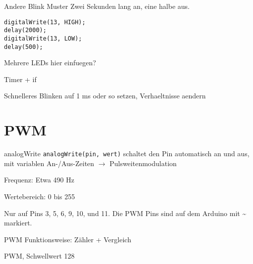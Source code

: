 \documentclass[bigger]{beamer}
\begin{document}
\begin{frame}[fragile,label=sec-1-4]{Andere Blink Muster}
 Zwei Sekunden lang an, eine halbe aus.

\pause

\begin{verbatim}
digitalWrite(13, HIGH);
delay(2000);
digitalWrite(13, LOW);
delay(500);
\end{verbatim}
\end{frame}

\begin{frame}[label=sec-1-5]{Mehrere LEDs}
hier einfuegen?

Timer + if
\end{frame}

\begin{frame}[label=sec-1-6]{Schnelleres Blinken}
auf 1 ms oder so setzen, Verhaeltnisse aendern
\end{frame}

\section{PWM}
\label{sec-2}
\begin{frame}[fragile,label=sec-2-1]{analogWrite}
 \verb~analogWrite(pin, wert)~ schaltet den Pin automatisch an und aus, mit
variablen An-/Aus-Zeiten $\rightarrow$ Pulsweitenmodulation

Frequenz: Etwa 490 Hz

Wertebereich: 0 bis 255

Nur auf Pins 3, 5, 6, 9, 10, und 11. Die PWM Pins sind auf dem Arduino
mit \textasciitilde{} markiert.
\end{frame}

\begin{frame}[label=sec-2-2]{PWM Funktionsweise: Zähler + Vergleich}
\end{frame}

\begin{frame}[label=sec-2-3]{PWM, Schwellwert 128}
\end{frame}
\end{document}
